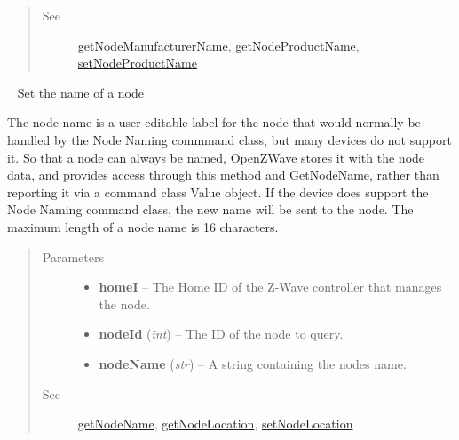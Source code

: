 \documentclass[letterpaper,10pt,english]{sphinxmanual}
\begin{document}
\begin{fulllineitems}
\begin{fulllineitems}
\begin{quote}
\begin{description}
\begin{itemize}
\end{itemize}

\item[{See}] \leavevmode
{\hyperref[libopenzwave:getnodemanufacturername]{getNodeManufacturerName}}, {\hyperref[libopenzwave:getnodeproductname]{getNodeProductName}}, {\hyperref[libopenzwave:setnodeproductname]{setNodeProductName}}

\end{description}\end{quote}

\end{fulllineitems}


\begin{fulllineitems}
\label{libopenzwave:libopenzwave.PyManager.setNodeName}~\label{libopenzwave:setnodename}
Set the name of a node

The node name is a user-editable label for the node that would normally be
handled by the Node Naming commmand class, but many devices do not support it.
So that a node can always be named, OpenZWave stores it with the node data, and
provides access through this method and GetNodeName, rather than reporting it
via a command class Value object.  If the device does support the Node Naming
command class, the new name will be sent to the node.  The maximum length of a
node name is 16 characters.
\begin{quote}\begin{description}
\item[{Parameters}] \leavevmode\begin{itemize}
\item {} 
\textbf{homeI} -- The Home ID of the Z-Wave controller that manages the node.

\item {} 
\textbf{nodeId} (\emph{int}) -- The ID of the node to query.

\item {} 
\textbf{nodeName} (\emph{str}) -- A string containing the nodes name.

\end{itemize}

\item[{See}] \leavevmode
{\hyperref[libopenzwave:getnodename]{getNodeName}}, {\hyperref[libopenzwave:getnodelocation]{getNodeLocation}}, {\hyperref[libopenzwave:setnodelocation]{setNodeLocation}}


\end{description}
\end{quote}
\end{fulllineitems}
\end{fulllineitems}
\end{document}
